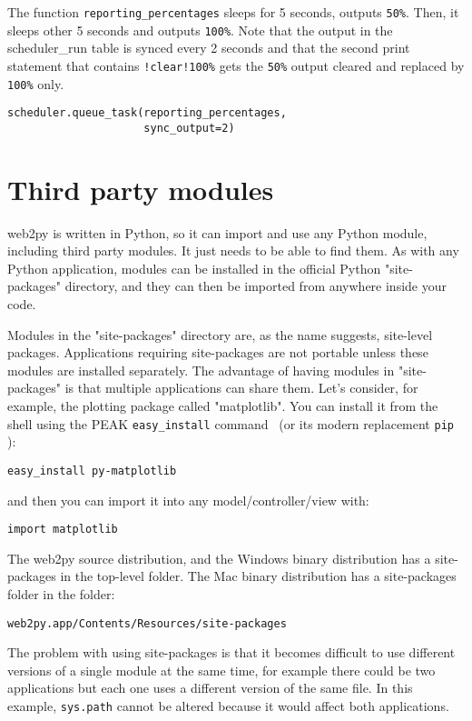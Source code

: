 \documentclass[justified,sixbynine,notoc]{tufte-book}
\def\ft{\small\tt}
\def\inxx#1{\index{#1}}
\begin{document}
\begin{fullwidth}
The function {\ft reporting\_percentages} sleeps for 5 seconds, outputs {\ft 50\%}.
Then, it sleeps other 5 seconds and outputs {\ft 100\%}. Note that the output in the scheduler\_run table is synced every 2 seconds and that the second print statement that contains {\ft !clear!100\%} gets the {\ft 50\%} output cleared and replaced by {\ft 100\%} only.

\begin{lstlisting}
scheduler.queue_task(reporting_percentages,
                     sync_output=2)
\end{lstlisting}

\goodbreak\section{Third party modules}

\inxx{import}
\noindent web2py is written in Python, so it can import and use any Python module, including third party modules. It just needs to be able to find them. As with any Python application, modules can be installed in the official Python "site-packages" directory, and they can then be imported from anywhere inside your code.

Modules in the "site-packages" directory are, as the name suggests, site-level packages. Applications requiring site-packages are not portable unless these modules are installed separately. The advantage of having modules in "site-packages" is that multiple applications can share them. Let's consider, for example, the plotting package called "matplotlib". You can install it from the shell using the PEAK {\ft easy\_install} command~\cite{easy-install} (or its modern replacement {\ft pip}~\cite{PIP} ):
\begin{lstlisting}
easy_install py-matplotlib
\end{lstlisting}
\noindent and then you can import it into any model/controller/view with:
\begin{lstlisting}
import matplotlib
\end{lstlisting}

The web2py source distribution, and the Windows binary distribution has a site-packages in the top-level folder. The Mac binary distribution has a site-packages folder in the folder:

{\ft web2py.app/Contents/Resources/site-packages}

The problem with using site-packages is that it becomes difficult to use different versions of a single module at the same time, for example there could be two applications but each one uses a different version of the same file.  In this example, {\ft sys.path} cannot be altered because it would affect both applications.


\end{fullwidth}
\end{document}
